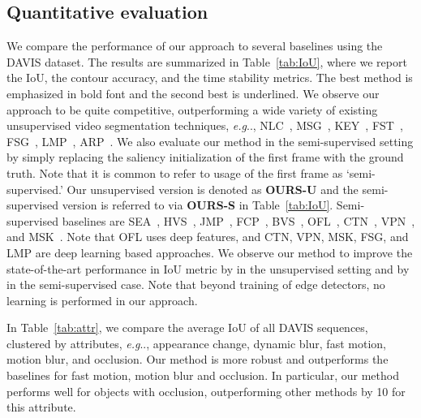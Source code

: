 \documentclass[runningheads]{llncs}
\makeatletter
\newcommand\para[1]{\noindent{#1}}
\def\@onedot{\ifx\@let@token.\else.\null\fi\xspace}
\DeclareRobustCommand\onedot{\futurelet\@let@token\@onedot}
\newcommand{\tabref}[1]{Table~\ref{#1}}
\def\eg{\emph{e.g}\onedot} \def\Eg{\emph{E.g}\onedot}
\makeatother
\begin{document}
\subsection{Quantitative evaluation}


 \para{\bf Evaluation on the DAVIS dataset:} We compare the performance of our approach to several baselines using the DAVIS dataset. The results are summarized in \tabref{tab:IoU}, where we report the IoU, the contour accuracy, and the time stability metrics. The best method is emphasized in bold font and the second best is underlined. We observe our approach to be quite competitive, outperforming a wide variety of existing unsupervised video segmentation techniques, \eg, 
NLC~\cite{FaktorBMVC14}, MSG~\cite{BroxECCV2010}, KEY~\cite{LeeICCV11}, FST~\cite{PapazoglouICCV13}, FSG~\cite{jain2017fusionseg}, LMP~\cite{TokmakovCVPR2017}, ARP~\cite{KohCVPR17}. We also evaluate our method in the semi-supervised setting by simply replacing the saliency initialization of the first frame with the ground truth. Note that it is common to refer to usage of the first frame as `semi-supervised.' Our unsupervised version is denoted as {\bf OURS-U} and the semi-supervised version is referred to via {\bf OURS-S} in \tabref{tab:IoU}. Semi-supervised baselines are 
SEA~\cite{AvinashCVPR14}, HVS~\cite{GrundmannCVPR2010}, JMP~\cite{FanTOG15}, FCP~\cite{PerazziICCV15}, BVS~\cite{MaerkiCVPR16}, OFL~\cite{TsaiCVPR2016}, CTN~\cite{JangCVPR17}, VPN~\cite{JampaniCVPR17}, and MSK~\cite{PerazziCVPR2017}. Note that OFL uses deep features, and CTN, VPN, MSK, FSG, and LMP are deep learning based approaches. We observe our method to improve the state-of-the-art performance in IoU metric by  in the unsupervised setting and by  in the semi-supervised case. Note that beyond training of edge detectors, no learning is performed in our approach. 

In \tabref{tab:attr}, we compare the average IoU of all DAVIS  sequences, clustered by attributes, \eg, appearance change, dynamic blur, fast motion, motion blur, and occlusion. Our method is more robust and outperforms the baselines for fast motion, motion blur and occlusion. In particular, our method performs well for objects with occlusion, outperforming other methods by 10 for this attribute.
\end{document}
